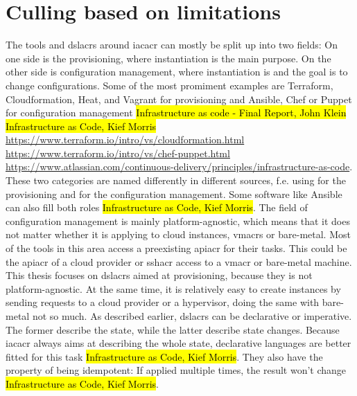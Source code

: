 \section{Culling based on limitations}
The tools and \gls{dslacr}s around \gls{iacacr} can mostly be split up into two fields: On one side is the provisioning, where instantiation is the main purpose. On the other side is configuration management, where instantiation is  and the goal is to change configurations. Some of the most promiment examples are Terraform, Cloudformation, Heat, and Vagrant for provisioning and Ansible, Chef or Puppet for configuration management \hl{Infrastructure as code - Final Report, John Klein} \hl{Infrastructure as Code, Kief Morris} \url{https://www.terraform.io/intro/vs/cloudformation.html} \url{https://www.terraform.io/intro/vs/chef-puppet.html} \url{https://www.atlassian.com/continuous-delivery/principles/infrastructure-as-code}.
\newline
These two categories are named differently in different sources, f.e. using  for the provisioning and  for the configuration management. Some software like Ansible can also fill both roles \hl{Infrastructure as Code, Kief Morris}.
\newline
The field of configuration management is mainly platform-agnostic, which means that it does not matter whether it is applying to cloud instances, \gls{vmacr}s or bare-metal. Most of the tools in this area access a preexisting \gls{apiacr} for their tasks. This could be the \gls{apiacr} of a cloud provider or \gls{sshacr} access to a \gls{vmacr} or bare-metal machine.
\newline
This thesis focuses on \gls{dslacr}s aimed at provisioning, because they is not platform-agnostic. At the same time, it is relatively easy to create instances by sending requests to a cloud provider or a hypervisor, doing the same with bare-metal not so much.
\newline %
As described earlier, \gls{dslacr}s can be declarative or imperative. The former describe the state, while the latter describe state changes. Because \gls{iacacr} always aims at describing the whole state, declarative languages are better fitted for this task \hl{Infrastructure as Code, Kief Morris}. They also have the property of being idempotent: If applied multiple times, the result won't change \hl{Infrastructure as Code, Kief Morris}.
